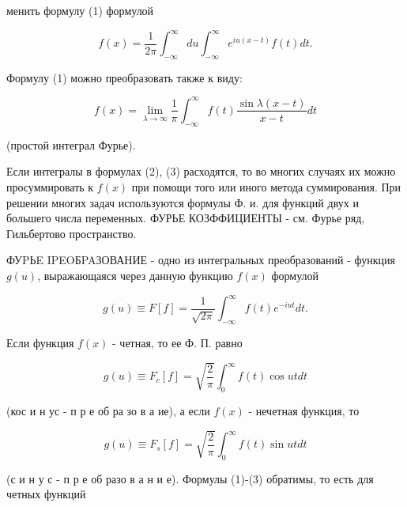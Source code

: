\documentclass[10pt]{article}
\begin{document}
менить формулу (1) формулой



\[

f(x)=\frac{1}{2 \pi} \int_{-\infty}^{\infty} d u \int_{-\infty}^{\infty} e^{i u(x-t)} f(t) d t .

\]



Формулу (1) можно преобразовать также к виду:



\[

f(x)=\lim _{\lambda \rightarrow \infty} \frac{1}{\pi} \int_{-\infty}^{\infty} f(t) \frac{\sin \lambda(x-t)}{x-t} d t

\]



(простой интеграл Фурье).



Если интегралы в формулах (2), (3) расходятся, то во многих случаях их можно просуммировать к $f(x)$ при помощи того или иного метода суммирования. При решении многих задач используются формулы Ф. и. для функций двух и большего числа переменных. ФУРЬЕ КОЗФФИЦИЕНТЫ - см. Фурье ряд, Гильбертово пространство.



ФУPЬE IPEOБPAЗОВАНИЕ - одно из интегральных преобразований - функция $g(u)$, выражающаяся через данную функцию $f(x)$ формулой



\[

g(u) \equiv F[f]=\frac{1}{\sqrt{2 \pi}} \int_{-\infty}^{\infty} f(t) e^{-i u t} d t .

\]



Если функция $f(x)$ - четная, то ее Ф. П. равно



\[

g(u) \equiv F_{c}[f]=\sqrt{\frac{2}{\pi}} \int_{0}^{\infty} f(t) \cos u t d t

\]



(кос и н ус - п р е об ра зо в а ие), а если $f(x)$ - нечетная функция, то



\[

g(u) \equiv F_{s}[f]=\sqrt{\frac{2}{\pi}} \int_{0}^{\infty} f(t) \sin u t d t

\]



(с и н у с - п р е об разо в а н и е). Формулы (1)-(3) обратимы, то есть для четных функций
\end{document}

